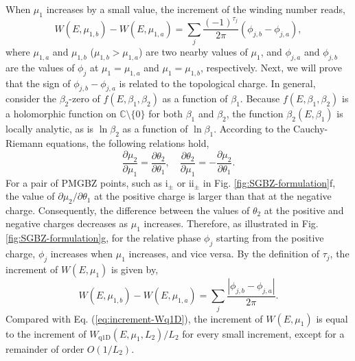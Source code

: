 When $\mu_{1}$ increases by a small value, the increment of the winding
number reads, 
\begin{equation}
W\left(E,\mu_{1,b}\right)-W\left(E,\mu_{1,a}\right)=\sum_{j}\frac{\left(-1\right)^{\tau_{j}}}{2\pi}\left(\phi_{j,b}-\phi_{j,a}\right),
\end{equation}
where $\mu_{1,a}$ and $\mu_{1,b}$ ($\mu_{1,b}>\mu_{1,a}$) are two
nearby values of $\mu_{1}$, and $\phi_{j,a}$ and $\phi_{j,b}$ are
the values of $\phi_{j}$ at $\mu_{1}=\mu_{1,a}$ and $\mu_{1}=\mu_{1,b}$,
respectively. Next, we will prove that the sign of $\phi_{j,b}-\phi_{j,a}$
is related to the topological charge. In general, consider the $\beta_{2}$-zero
of $f(E,\beta_{1},\beta_{2})$ as a function of $\beta_{1}$. Because
$f(E,\beta_{1},\beta_{2})$ is a holomorphic function on $\mathbb{C}\setminus\{0\}$
for both $\beta_{1}$ and $\beta_{2}$, the function $\beta_{2}(E,\beta_{1})$
is locally analytic, as is $\ln\beta_{2}$ as a function of $\ln\beta_{1}$.
According to the Cauchy-Riemann equations, the following relations
hold, 
\begin{equation}
\frac{\partial\mu_{2}}{\partial\mu_{1}}=\frac{\partial\theta_{2}}{\partial\theta_{1}},\quad\frac{\partial\theta_{2}}{\partial\mu_{1}}=-\frac{\partial\mu_{2}}{\partial\theta_{1}}.\label{eq:Cauchy-Riemann}
\end{equation}
For a pair of PMGBZ points, such as $\text{i}_{\pm}$ or $\text{ii}_{\pm}$
in Fig. \ref{fig:SGBZ-formulation}f, the value of $\partial\mu_{2}/\partial\theta_{1}$
at the positive charge is larger than that at the negative charge.
Consequently, the difference between the values of $\theta_{2}$ at
the positive and negative charges decreases as $\mu_{1}$ increases.
Therefore, as illustrated in Fig. \ref{fig:SGBZ-formulation}g, for
the relative phase $\phi_{j}$ starting from the positive charge,
$\phi_{j}$ increases when $\mu_{1}$ increases, and vice versa. By
the definition of $\tau_{j}$, the increment of $W(E,\mu_{1})$ is
given by, 
\begin{equation}
W\left(E,\mu_{1,b}\right)-W\left(E,\mu_{1,a}\right)=\sum_{j}\frac{\left|\phi_{j,b}-\phi_{j,a}\right|}{2\pi}.
\end{equation}
Compared with Eq. (\ref{eq:increment-Wq1D}), the increment of $W(E,\mu_{1})$
is equal to the increment of $W_{\text{q1D}}(E,\mu_{1},L_{2})/L_{2}$
for every small increment, except for a remainder of order $O(1/L_{2})$.

